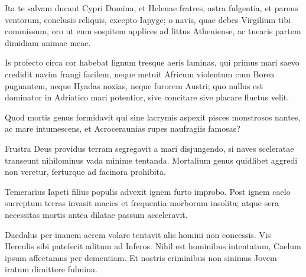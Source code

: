 {
\setlength{\parindent}{0pt}

Ita te salvam ducant Cypri Domina, et Helenae fratres, astra fulgentia, et parens ventorum, conclusis reliquis, excepto Iapyge; o navis, quae debes Virgilium tibi commissum, oro ut eum sospitem applices ad littus Atheniense, ac tuearis partem dimidiam animae meae. 

Is profecto circa cor habebat lignum tresque aeris laminas, qui primus mari saevo credidit navim frangi facilem, neque metuit Africum violentum cum Borea pugnantem, neque Hyadas noxias, neque furorem Austri; quo nullus est dominator in Adriatico mari potentior, sive concitare sive placare fluctus velit. 

Quod mortis genus formidavit qui sine lacrymis aspexit pisces monstrosos nantes, ac mare intumescens, et Acroceraunias rupes naufragiis famosas? 

Frustra Deus providus terram segregavit a mari disjungendo, si naves sceleratae transeunt nihilominus vada minime tentanda. Mortalium genus quidlibet aggredi non veretur, ferturque ad facinora prohibita. 

Temerarius Iapeti filius populis advexit ignem furto improbo. Post ignem caelo surreptum terras invasit macies et frequentia morborum insolita; atque sera necessitas mortis antea dilatae passum acceleravit. 

Daedalus per inanem aerem volare tentavit alis homini non concessis. Vis Herculis sibi patefecit aditum ad Inferos. Nihil est hominibus intentatum, Caelum ipsum affectamus per dementiam. Et nostris criminibus non sinimus Jovem iratum dimittere fulmina.


}
